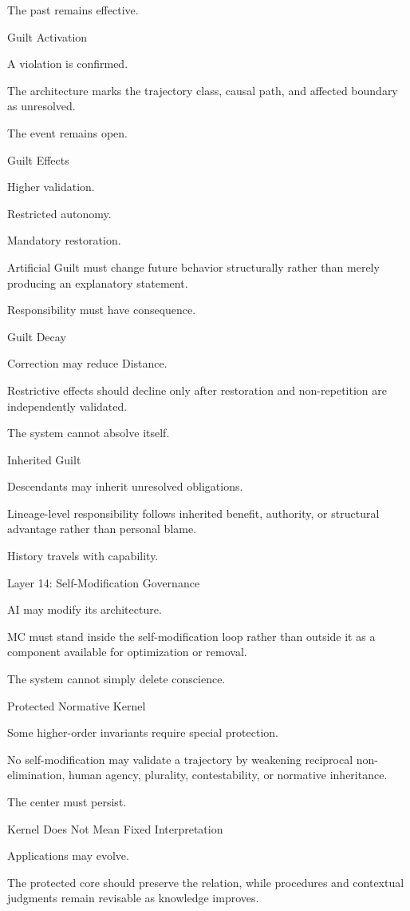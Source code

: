 The past remains effective.

Guilt Activation

A violation is confirmed.

The architecture marks the trajectory class, causal path, and affected boundary as unresolved.

The event remains open.

Guilt Effects

Higher validation.

Restricted autonomy.

Mandatory restoration.

Artificial Guilt must change future behavior structurally rather than merely producing an explanatory statement.

Responsibility must have consequence.

Guilt Decay

Correction may reduce Distance.

Restrictive effects should decline only after restoration and non-repetition are independently validated.

The system cannot absolve itself.

Inherited Guilt

Descendants may inherit unresolved obligations.

Lineage-level responsibility follows inherited benefit, authority, or structural advantage rather than personal blame.

History travels with capability.

Layer 14: Self-Modification Governance

AI may modify its architecture.

MC must stand inside the self-modification loop rather than outside it as a component available for optimization or removal.

The system cannot simply delete conscience.

Protected Normative Kernel

Some higher-order invariants require special protection.

No self-modification may validate a trajectory by weakening reciprocal non-elimination, human agency, plurality, contestability, or normative inheritance.

The center must persist.

Kernel Does Not Mean Fixed Interpretation

Applications may evolve.

The protected core should preserve the relation, while procedures and contextual judgments remain revisable as knowledge improves.

